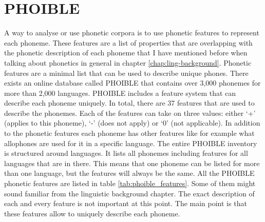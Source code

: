 \section{PHOIBLE}
\label{sec:phoible}
A way to analyse or use phonetic corpora is to use phonetic features to represent each phoneme. These features are a list of properties that are overlapping with the phonetic description of each phoneme that I have mentioned before when talking about phonetics in general in chapter \ref{chap:ling-background}. Phonetic features are a minimal list that can be used to describe unique phones. There exists an online database called PHOIBLE \citep{phoible} that contains over 3,000 phonemes for more than 2,000 languages. PHOIBLE includes a feature system that can describe each phoneme uniquely. In total, there are 37 features that are used to describe the phonemes. Each of the features can take on three values: either `+' (applies to this phoneme), `-' (does not apply) or `0' (not applicable). In addition to the phonetic features each phoneme has other features like for example what allophones are used for it in a specific language. The entire PHOIBLE inventory is structured around languages. It lists all phonemes including features for all languages that are in there. This means that one phoneme can be listed for more than one language, but the features will always be the same. All the PHOIBLE phonetic features are listed in table \ref{tab:phoible_features}. Some of them might sound familiar from the linguistic background chapter. The exact description of each and every feature is not important at this point. The main point is that these features allow to uniquely describe each phoneme.



